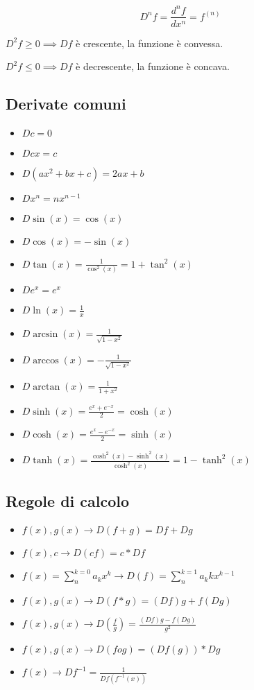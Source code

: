 \documentclass{subfiles}
\begin{document}
$$
D^nf = \frac{d^nf}{dx^n} = f^{(n)}
$$

\begin{description}
    \item $D^2f \geq 0 \implies Df$ è crescente, la funzione è convessa.
    \item $D^2f \leq 0 \implies Df$ è decrescente, la funzione è concava.
\end{description}

\subsection{Derivate comuni}

\begin{itemize}
    \item $Dc = 0$
    \item $Dcx = c$
    \item $D(ax^2 + bx + c) = 2ax + b$
    \item $Dx^n = nx^{n - 1}$
    \item $D\sin(x) = \cos(x)$
    \item $D\cos(x) = -\sin(x)$
    \item $D\tan(x) = \frac{1}{\cos^2(x)} = 1 + \tan^2(x)$
    \item $De^x = e^x$
    \item $D\ln(x) = \frac{1}{x}$
    \item $D\arcsin(x) = \frac{1}{\sqrt{1 - x^2}}$
    \item $D\arccos(x) = -\frac{1}{\sqrt{1 - x^2}}$
    \item $D\arctan(x) = \frac{1}{1 + x^2}$
    \item $D\sinh(x) = \frac{e^x + e^{-x}}{2} = \cosh(x)$
    \item $D\cosh(x) = \frac{e^x - e^{-x}}{2} = \sinh(x)$
    \item $D\tanh(x) = \frac{\cosh^2(x) - \sinh^2(x)}{\cosh^2(x)} = 1 - \tanh^2(x)$
\end{itemize}

\subsection{Regole di calcolo}

\begin{itemize}
    \item $f(x), g(x) \rightarrow D(f + g) = Df + Dg$
    \item $f(x), c \rightarrow D(cf) = c * Df$
    \item $f(x) = \sum_{n}^{k = 0} a_k x^k \rightarrow D(f) = \sum_{n}^{k = 1} a_k k x^{k - 1}$
    \item $f(x), g(x) \rightarrow D(f * g) = (Df)g + f(Dg)$
    \item $f(x), g(x) \rightarrow D(\frac{f}{g}) = \frac{(Df)g - f(Dg)}{g^2}$
    \item $f(x), g(x) \rightarrow D(f o g) = (Df(g)) * Dg$
    \item $f(x) \rightarrow Df^{-1} = \frac{1}{Df(f^{-1}(x))}$
\end{itemize}
\end{document}
